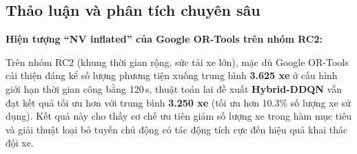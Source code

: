 \documentclass[13pt,a4paper]{extarticle}
\begin{document}
\begin{table}[!htbp]
\centering
\caption{So sánh tổng hợp hiệu năng trung bình theo lớp dữ liệu Solomon với cấu hình 5000 vòng lặp}
\label{tab:solomon_results}
\end{table}

\subsection{Thảo luận và phân tích chuyên sâu}

\textbf{Hiện tượng ``NV inflated'' của Google OR-Tools trên nhóm RC2:}

Trên nhóm RC2 (khung thời gian rộng, sức tải xe lớn), mặc dù Google OR-Tools cải thiện đáng kể số lượng phương tiện xuống trung bình \textbf{3.625 xe} ở cấu hình giới hạn thời gian công bằng 120\,s, thuật toán lai đề xuất \textbf{Hybrid-DDQN} vẫn đạt kết quả tối ưu hơn với trung bình \textbf{3.250 xe} (tối ưu hơn 10.3\% số lượng xe sử dụng). Kết quả này cho thấy cơ chế ưu tiên giảm số lượng xe trong hàm mục tiêu và giải thuật loại bỏ tuyến chủ động có tác động tích cực đến hiệu quả khai thác đội xe.
\end{document}
